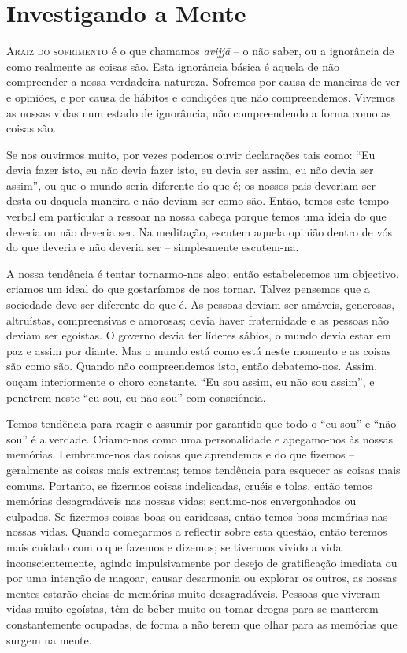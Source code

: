\chapter{Investigando a Mente}

\lettrine{A}{raiz do sofrimento} é o que chamamos \emph{avijjā} -- o não saber, ou a ignorância de
como realmente as coisas são. Esta ignorância básica é aquela de não compreender
a nossa verdadeira natureza. Sofremos por causa de maneiras de ver e opiniões, e
por causa de hábitos e condições que não compreendemos. Vivemos as nossas vidas
num estado de ignorância, não compreendendo a forma como as coisas são.

Se nos ouvirmos muito, por vezes podemos ouvir declarações tais como: ``Eu devia
fazer isto, eu não devia fazer isto, eu devia ser assim, eu não devia ser
assim'', ou que o mundo seria diferente do que é; os nossos pais deveriam ser
desta ou daquela maneira e não deviam ser como são. Então, temos este tempo
verbal em particular a ressoar na nossa cabeça porque temos uma ideia do que
deveria ou não deveria ser. Na meditação, escutem aquela opinião dentro de vós
do que deveria e não deveria ser -- simplesmente escutem-na.

A nossa tendência é tentar tornarmo-nos algo; então estabelecemos um objectivo,
criamos um ideal do que gostaríamos de nos tornar. Talvez pensemos que a
sociedade deve ser diferente do que é. As pessoas deviam ser amáveis, generosas,
altruístas, compreensivas e amorosas; devia haver fraternidade e as pessoas não
deviam ser egoístas. O governo devia ter líderes sábios, o mundo devia estar em
paz e assim por diante. Mas o mundo está como está neste momento e as coisas são
como são. Quando não compreendemos isto, então debatemo-nos. Assim, ouçam
interiormente o choro constante. ``Eu sou assim, eu não sou assim'', e penetrem
neste ``eu sou, eu não sou'' com consciência.

Temos tendência para reagir e assumir por garantido que todo o ``eu sou'' e
``não sou'' é a verdade. Criamo-nos como uma personalidade e apegamo-nos às
nossas memórias. Lembramo-nos das coisas que aprendemos e do que fizemos --
geralmente as coisas mais extremas; temos tendência para esquecer as coisas mais
comuns. %
Portanto, se fizermos coisas indelicadas, cruéis e tolas, então temos
memórias desagradáveis nas nossas vidas; sentimo-nos envergonhados ou culpados.
Se fizermos coisas boas ou caridosas, então temos boas memórias nas nossas
vidas. Quando começarmos a reflectir sobre esta questão, então teremos mais
cuidado com o que fazemos e dizemos; se tivermos vivido a vida
inconscientemente, agindo impulsivamente por desejo de gratificação imediata ou
por uma intenção de magoar, causar desarmonia ou explorar os outros, as nossas
mentes estarão cheias de memórias muito desagradáveis. Pessoas que viveram vidas
muito egoístas, têm de beber muito ou tomar drogas para se manterem
constantemente ocupadas, de forma a não terem que olhar para as memórias que
surgem na mente.

